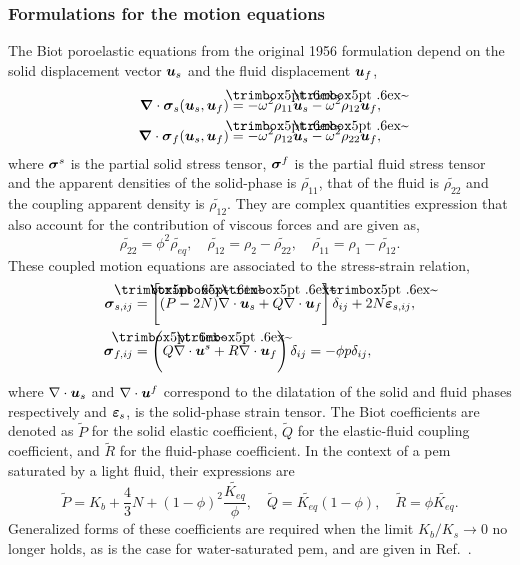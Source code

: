         \subsubsection{Formulations for the motion equations}
The Biot poroelastic equations from the original 1956 formulation \cite{biot1954,biot1956,biot1956a} depend on the solid displacement vector $\boldsymbol u_s$ and the fluid displacement $\boldsymbol u_f$,
\begin{equation}
    \begin{aligned}
        \mbf \nabla \cdot \mbf \sigma_s (\mbf u_s, \mbf u_f) &= - \omega^2 \tilde{\rho_{11}} \mbf u_s - \omega^2 \tilde{\rho_{12}} \mbf u_f,\\
        \mbf \nabla \cdot \mbf \sigma_f (\mbf u_s, \mbf u_f) &= - \omega^2 \tilde{\rho_{12}} \mbf u_s - \omega^2 \tilde{\rho_{22}} \mbf u_f,\\
    \end{aligned}
    \label{eq:chap1_biot}
\end{equation}
where $\boldsymbol \sigma^s$ is the partial solid stress tensor, $\boldsymbol \sigma^f$ is the partial fluid stress tensor and the apparent densities of the solid-phase is $\tilde{\rho_{11}}$, that of the fluid is $\tilde{\rho_{22}}$ and the coupling apparent density is $\tilde{\rho_{12}}$. They are complex quantities expression that also account for the contribution of viscous forces and are given as, 
\begin{equation}
    \tilde{\rho_{22}} = \phi^2 \tilde{\rho_{eq}}, \quad \tilde{\rho_{12}} = \rho_2 - \tilde{\rho_{22}}, \quad \tilde{\rho_{11}} = \rho_1 - \tilde{\rho_{12}}.
\end{equation}
These coupled motion equations are associated to the stress-strain relation, 
\begin{equation}
    \begin{aligned}
        \mbf \sigma_{s,ij} &= \left[ (\tilde P-2\tilde N)\nabla\cdot \mbf u_s + \tilde Q\nabla\cdot \mbf u_f \right] \delta_{ij} + 2\tilde N \mbf \varepsilon_{s, ij},\\
        \mbf \sigma_{f,ij} &= \left(\tilde Q\nabla\cdot \mbf u^s + \tilde R\nabla\cdot \mbf u_f\right)\delta_{ij} = - \phi p\delta_{ij}, \\
    \end{aligned}
    \label{eq:stress_usuf}
\end{equation} where $\nabla\cdot \boldsymbol u_s$ and $\nabla\cdot \boldsymbol u^f$ correspond to the dilatation of the solid and fluid phases respectively and $\boldsymbol \varepsilon_s$, is the solid-phase strain tensor. The Biot coefficients are denoted as $\tilde P$ for the solid elastic coefficient, $\tilde Q$ for the elastic-fluid coupling coefficient, and $\tilde R$ for the fluid-phase coefficient. In the context of a \acrshort{pem} saturated by a light fluid, their expressions are
\begin{equation}
    \tilde P = K_b + \frac 4 3 N + (1-\phi)^2 \frac{\tilde{K_{eq}}}{\phi}, \quad \tilde Q = \tilde{K_{eq}}(1 - \phi), \quad \tilde R = \phi \tilde{K_{eq}}.
\end{equation}
Generalized forms of these coefficients are required when the limit $K_b/K_s \rightarrow 0$ no longer holds, as is the case for water-saturated \acrshort{pem}, and are given in Ref.~\cite{allard2009}. 

